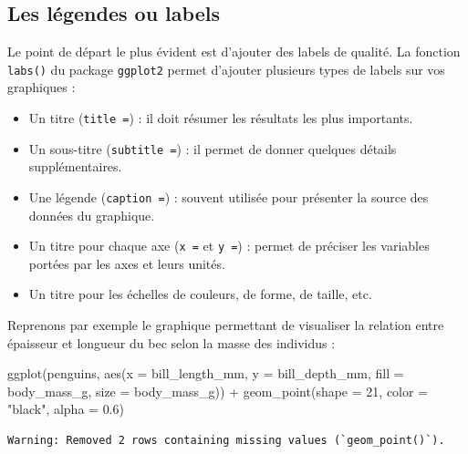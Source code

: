 \documentclass[
  a4paper,
  DIV=11,
  numbers=noendperiod,
  oneside]{scrreprt}
\newenvironment{Shaded}{}{}
\newcommand{\AttributeTok}[1]{\textcolor[rgb]{0.84,0.23,0.29}{#1}}
\newcommand{\DecValTok}[1]{\textcolor[rgb]{0.00,0.36,0.77}{#1}}
\newcommand{\FloatTok}[1]{\textcolor[rgb]{0.00,0.36,0.77}{#1}}
\newcommand{\FunctionTok}[1]{\textcolor[rgb]{0.44,0.26,0.76}{#1}}
\newcommand{\NormalTok}[1]{\textcolor[rgb]{0.14,0.16,0.18}{#1}}
\newcommand{\SpecialCharTok}[1]{\textcolor[rgb]{0.00,0.36,0.77}{#1}}
\newcommand{\StringTok}[1]{\textcolor[rgb]{0.01,0.18,0.38}{#1}}
\providecommand{\tightlist}{%
  \setlength{\itemsep}{0pt}\setlength{\parskip}{0pt}}\usepackage{longtable,booktabs,array}
\begin{document}
\subsection{Les légendes ou labels}\label{les-luxe9gendes-ou-labels}

Le point de départ le plus évident est d'ajouter des labels de qualité.
La fonction \texttt{labs()} du package \texttt{ggplot2} permet d'ajouter
plusieurs types de labels sur vos graphiques :

\begin{itemize}
\tightlist
\item
  Un titre (\texttt{title\ =}) : il doit résumer les résultats les plus
  importants.
\item
  Un sous-titre (\texttt{subtitle\ =}) : il permet de donner quelques
  détails supplémentaires.
\item
  Une légende (\texttt{caption\ =}) : souvent utilisée pour présenter la
  source des données du graphique.
\item
  Un titre pour chaque axe (\texttt{x\ =} et \texttt{y\ =}) : permet de
  préciser les variables portées par les axes et leurs unités.
\item
  Un titre pour les échelles de couleurs, de forme, de taille, etc.
\end{itemize}

Reprenons par exemple le graphique permettant de visualiser la relation
entre épaisseur et longueur du bec selon la masse des individus :

\begin{Shaded}
\begin{Highlighting}[]
\FunctionTok{ggplot}\NormalTok{(penguins, }\FunctionTok{aes}\NormalTok{(}\AttributeTok{x =}\NormalTok{ bill\_length\_mm, }\AttributeTok{y =}\NormalTok{ bill\_depth\_mm,}
                     \AttributeTok{fill =}\NormalTok{ body\_mass\_g, }\AttributeTok{size =}\NormalTok{ body\_mass\_g)) }\SpecialCharTok{+}
  \FunctionTok{geom\_point}\NormalTok{(}\AttributeTok{shape =} \DecValTok{21}\NormalTok{, }\AttributeTok{color =} \StringTok{"black"}\NormalTok{, }\AttributeTok{alpha =} \FloatTok{0.6}\NormalTok{)}
\end{Highlighting}
\end{Shaded}

\begin{verbatim}
Warning: Removed 2 rows containing missing values (`geom_point()`).
\end{verbatim}
\end{document}
